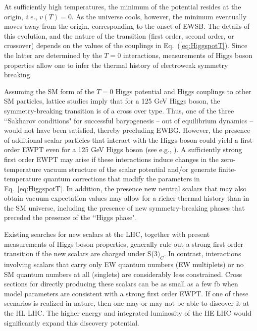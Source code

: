 At sufficiently high temperatures, the minimum of the potential resides at the origin, {\it i.e.}, $v(T) = 0$. As the universe cools, however, the minimum eventually moves away from the origin, corresponding to the onset of EWSB. The details of this evolution, and the nature of the transition (first order, second order, or crossover) depends on the values of the couplings in Eq.~(\ref{eq:HiggspotT}). Since the latter are determined by the $T=0$ interactions, measurements of Higgs boson properties allow one to infer the thermal history of electroweak symmetry breaking. 

Assuming the SM form of the $T=0$ Higgs potential and Higgs couplings to other SM particles, lattice studies imply that for a 125 GeV Higgs boson, the symmetry-breaking transition is of a cross over type\cite{Rummukainen:1998as,Csikor:1998eu,Laine:1998jb,Gurtler:1997hr}. Thus, one of the three \lq\lq Sakharov conditions" for successful baryogenesis\cite{Sakharov:1967dj} -- out of equilibrium dynamics -- would not have been satisfied, thereby precluding EWBG. However, the presence of additional scalar particles that interact with the Higgs boson could yield a first order EWPT even for a 125 GeV Higgs boson (see e.g., \cite{Morrissey:2012db,Assamagan:2016azc}). A sufficiently strong first order EWPT may arise if these interactions induce changes in the zero-temperature vacuum structure of the scalar potential and/or generate finite-temperature quantum corrections that modify the parameters in Eq.~\ref{eq:HiggspotT}. In addition, the presence new neutral scalars that may also obtain vacuum expectation values may allow for a richer thermal history than in the SM universe, including the presence of new symmetry-breaking phases that preceded the presence of the \lq\lq Higgs phase"\cite{Patel:2012pi,Patel:2013zla,Blinov:2015sna}. 

 Existing searches for new scalars at the LHC, together with present measurements of Higgs boson properties, generally rule out a strong first order transition if the new scalars are charged under S(3$)_C$\cite{Katz:2014bha,Katz:2015uja}. In contrast, interactions involving scalars that carry only EW quantum numbers (EW multiplets) or no SM quantum numbers at all (singlets) are considerably less constrained. Cross sections for directly producing these scalars can be as small as a few fb when model parameters are consistent with a strong first order EWPT. If one of these scenarios is realized in nature, then one may or may not be able to discover it at the HL LHC. The higher energy and integrated luminosity of the HE LHC would significantly expand this discovery potential. 

